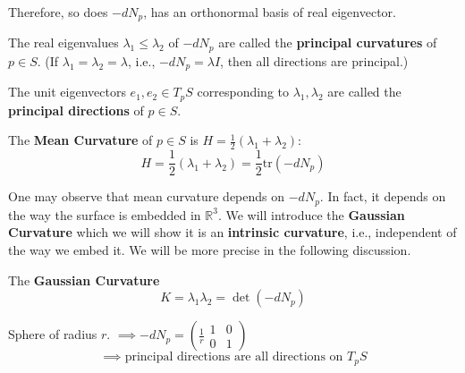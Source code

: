 \documentclass{article}
\begin{document}
Therefore, so does $-d N_p$, has an orthonormal basis of real eigenvector.

\begin{definition}
    The real eigenvalues $\lambda_1 \leq \lambda_2$ of $-d N_p$ are called the \textbf{principal curvatures} of $p \in S$.
    (If $\lambda_1 = \lambda_2 = \lambda$, i.e., $-d N_p = \lambda I$, then all directions are principal.)

    The unit eigenvectors $e_1, e_2 \in T_p S$ corresponding to $\lambda_1, \lambda_2$ are called the \textbf{principal directions} of $p \in S$.
\end{definition}

The \textbf{Mean Curvature} of $p \in S$ is $H = \frac{1}{2}(\lambda_1 + \lambda_2)$:
$$H = \frac{1}{2}(\lambda_1 + \lambda_2) = \frac{1}{2} \text{tr}(-d N_p)$$

\begin{remark}
    One may observe that mean curvature depends on $-d N_p$. In fact, it depends on the way the surface is embedded in $\mathbb{R}^3$.
    We will introduce the \textbf{Gaussian Curvature} which we will show it is an \textbf{intrinsic curvature}, i.e., independent of the way we embed it. We will be more precise in the following discussion.
\end{remark}

\begin{definition}
    The \textbf{Gaussian Curvature}
    $$K = \lambda_1 \lambda_2 = \det(-d N_p)$$
\end{definition}

\begin{example}
    Sphere of radius $r$. $\implies -d N_p = \left( \frac{1}{r} \begin{array}{cc} 1 & 0 \\ 0 & 1 \end{array} \right)$
    $$\implies \text{principal directions are all directions on } T_p S$$
\end{example}
\end{document}
